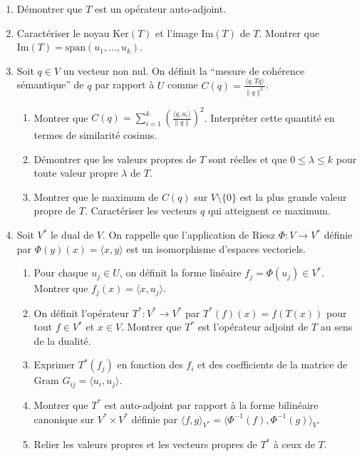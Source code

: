 \documentclass[11pt,a4paper]{report}
\begin{document}
\begin{enumerate}
\def\labelenumi{\arabic{enumi}.}

\item
  Démontrer que \(T\) est un opérateur auto-adjoint.
\item
  Caractériser le noyau \(\text{Ker}(T)\) et l'image \(\text{Im}(T)\) de
  \(T\). Montrer que \(\text{Im}(T) = \text{span}(u_1, \dots, u_k)\).
\item
  Soit \(q \in V\) un vecteur non nul. On définit la ``mesure de
  cohérence sémantique'' de \(q\) par rapport à \(U\) comme
  \(C(q) = \frac{\langle q, Tq \rangle}{\|q\|^2}\).

  \begin{enumerate}
  \def\labelenumii{\alph{enumii}.}

  \item
    Montrer que
    \(C(q) = \sum_{i=1}^k \left( \frac{\langle q, u_i \rangle}{\|q\|} \right)^2\).
    Interpréter cette quantité en termes de similarité cosinus.
  \item
    Démontrer que les valeurs propres de \(T\) sont réelles et que
    \(0 \le \lambda \le k\) pour toute valeur propre \(\lambda\) de
    \(T\).
  \item
    Montrer que le maximum de \(C(q)\) sur \(V \setminus \{0\}\) est la
    plus grande valeur propre de \(T\). Caractériser les vecteurs \(q\)
    qui atteignent ce maximum.
  \end{enumerate}
\item
  Soit \(V^*\) le dual de \(V\). On rappelle que l'application de Riesz
  \(\Phi: V \to V^*\) définie par \(\Phi(y)(x) = \langle x, y \rangle\)
  est un isomorphisme d'espaces vectoriels.

  \begin{enumerate}
  \def\labelenumii{\alph{enumii}.}

  \item
    Pour chaque \(u_j \in U\), on définit la forme linéaire
    \(f_j = \Phi(u_j) \in V^*\). Montrer que
    \(f_j(x) = \langle x, u_j \rangle\).
  \item
    On définit l'opérateur \(T^*: V^* \to V^*\) par
    \(T^*(f)(x) = f(T(x))\) pour tout \(f \in V^*\) et \(x \in V\).
    Montrer que \(T^*\) est l'opérateur adjoint de \(T\) au sens de la
    dualité.
  \item
    Exprimer \(T^*(f_j)\) en fonction des \(f_i\) et des coefficients de
    la matrice de Gram \(G_{ij} = \langle u_i, u_j \rangle\).
  \item
    Montrer que \(T^*\) est auto-adjoint par rapport à la forme
    bilinéaire canonique sur \(V^* \times V^*\) définie par
    \(\langle f, g \rangle_{V^*} = \langle \Phi^{-1}(f), \Phi^{-1}(g) \rangle_V\).
  \item
    Relier les valeurs propres et les vecteurs propres de \(T^*\) à ceux
    de \(T\).
  \end{enumerate}
\end{enumerate}
\end{document}
